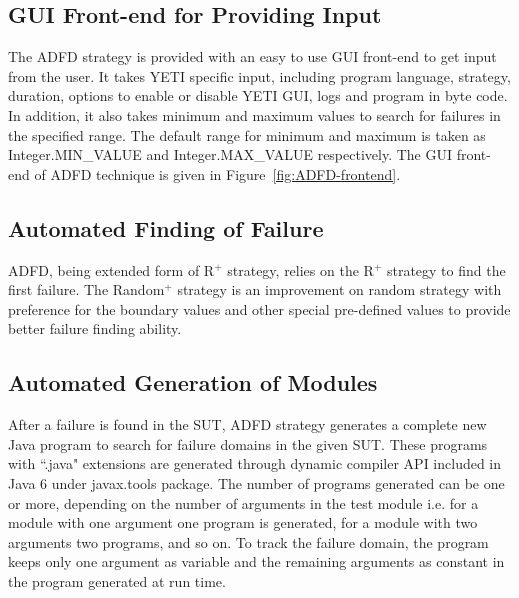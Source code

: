 \subsection{GUI Front-end for Providing Input}
The ADFD strategy is provided with an easy to use GUI front-end to get input from the user. It takes YETI specific input, including program language, strategy, duration, options to enable or disable YETI GUI, logs and program in byte code. In addition, it also takes minimum and maximum values to search for failures in the specified range. The default range for minimum and maximum is taken as Integer.MIN\_VALUE and Integer.MAX\_VALUE respectively. The GUI front-end of ADFD technique is given in Figure~\ref{fig:ADFD-frontend}.


\subsection{Automated Finding of Failure}
ADFD, being extended form of R$^+$ strategy, relies on the R$^+$ strategy to find the first failure. The Random$^+$ strategy is an improvement on random strategy with preference for the boundary values and other special pre-defined values to provide better failure finding ability. %

\subsection{Automated Generation of Modules}
After a failure is found in the SUT, ADFD strategy generates a complete new Java program to search for failure domains in the given SUT.  These programs with ``.java" extensions are generated through dynamic compiler API included in Java 6 under javax.tools package. The number of programs generated can be one or more, depending on the number of arguments in the test module i.e. for a module with one argument one program is generated, for a module with two arguments two programs, and so on. To track the failure domain, the program keeps only one argument as variable and the remaining arguments as constant in the program generated at run time.

